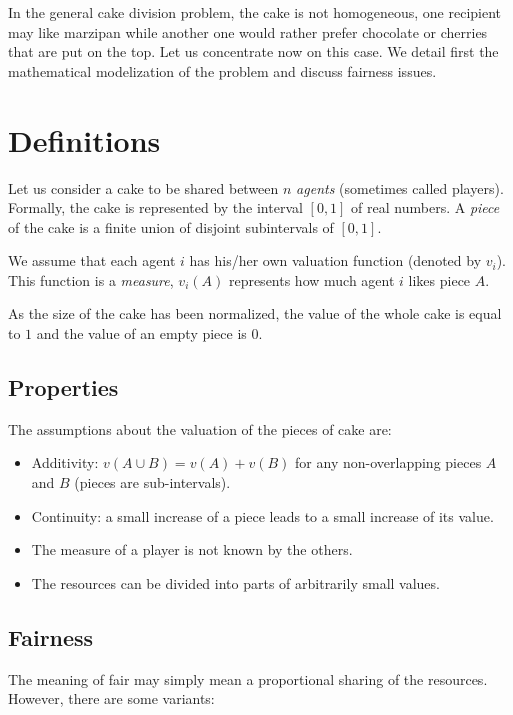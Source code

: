 In the general cake division problem, the cake is not homogeneous, 
one recipient may like marzipan while another one would rather prefer chocolate or cherries
that are put on the top.
Let us concentrate now on this case.
We detail first the mathematical modelization of the problem and discuss fairness issues. 

\section{Definitions}

Let us consider a cake to be shared between $n$ \textit{agents} (sometimes called players). 
Formally, the cake is represented by the interval $[0,1]$ of real numbers.
A \textit{piece} of the cake is a finite union of disjoint subintervals of $[0,1]$.

We assume that each agent $i$ has his/her own valuation function (denoted by $v_i$).
This function is a \textit{measure}, $v_i(A)$ represents how much agent $i$ likes piece $A$. 

As the size of the cake has been normalized, the value of the whole cake is equal to $1$
and the value of an empty piece is $0$.

\subsection{Properties}

The assumptions about the valuation of the pieces of cake are:
\begin{itemize}
\item Additivity: $v(A \cup B) = v(A) + v(B)$ for any non-overlapping pieces $A$ and $B$
(pieces are sub-intervals). 
\item 
Continuity: a small increase of a piece leads to a small increase of its value. 
\item The measure of a player is not known by the others.
\item The resources can be divided into parts of arbitrarily small values.
\end{itemize}

\subsection{Fairness}

The meaning of fair may simply mean a proportional sharing of the resources. 
However, there are some variants:

